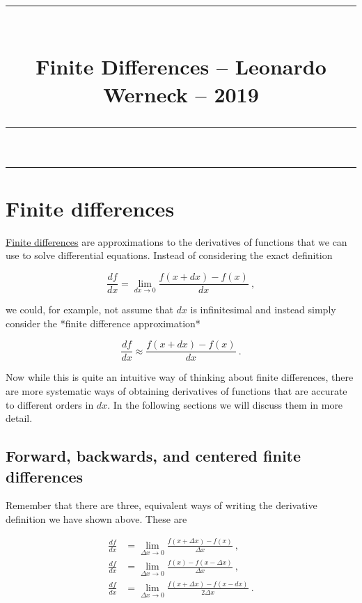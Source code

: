 \documentclass[a4paper,11pt]{article}
\title{\rule{\textwidth}{1pt}\\\textbf{Finite Differences} -- Leonardo Werneck -- 2019\\\rule[0.3cm]{\textwidth}{1pt}}
\author{}
\date{}
\begin{document}
\maketitle
\vspace*{-2.5cm}
\tableofcontents

\thispagestyle{fancy}

\begin{center}
\rule{\textwidth}{1pt}
\end{center}

\section{Finite differences}

\href{https://en.wikipedia.org/wiki/Finite_difference}{Finite differences} are approximations to the derivatives of functions that we can use to solve differential equations. Instead of considering the exact definition

\begin{equation}
\frac{df}{dx} = \lim_{dx\to0}\frac{f(x+dx) - f(x)}{dx}\ ,
\end{equation}

we could, for example, not assume that $dx$ is infinitesimal and instead simply consider the *finite difference approximation*

\begin{equation}
\frac{df}{dx} \approx \frac{f(x+dx) - f(x)}{dx}\ .
\end{equation}

Now while this is quite an intuitive way of thinking about finite differences, there are more systematic ways of obtaining derivatives of functions that are accurate to different orders in $dx$. In the following sections we will discuss them in more detail.

\subsection{Forward, backwards, and centered finite differences}

Remember that there are three, equivalent ways of writing the derivative definition we have shown above. These are

\begin{equation}
\begin{aligned}
\frac{df}{dx} &= \lim_{\Delta x\to0}\frac{f(x+\Delta x) - f(x)}{\Delta x}    \ ,\\
\frac{df}{dx} &= \lim_{\Delta x\to0}\frac{f(x)    - f(x-\Delta x)}{\Delta x} \ ,\\
\frac{df}{dx} &= \lim_{\Delta x\to0}\frac{f(x+\Delta x) - f(x-dx)}{2\Delta x}\ .
\end{aligned}
\end{equation}
\end{document}

